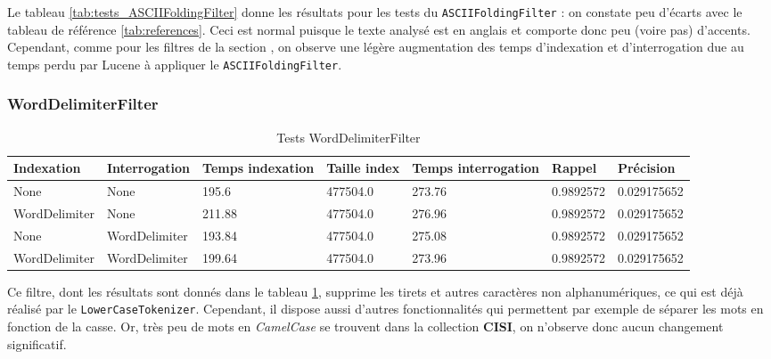Le tableau \ref{tab:tests_ASCIIFoldingFilter} donne les résultats pour les tests du \texttt{ASCIIFoldingFilter} : on constate peu d’écarts avec le tableau de référence \ref{tab:references}. Ceci est normal puisque le texte analysé est en anglais et comporte donc peu (voire pas) d’accents. Cependant, comme pour les filtres de la section \label{section:filtrespourris}, on observe une légère augmentation des temps d’indexation et d’interrogation due au temps perdu par Lucene à appliquer le \texttt{ASCIIFoldingFilter}.

\subsubsection{WordDelimiterFilter}

\begin{table}[!htbp]
    \hspace{-2cm}
                \begin{tabular}{|p{2.1cm}|p{2.1cm}|p{2cm}|p{2cm}|p{2.5cm}|p{2.5cm}|p{2.5cm}|}
                    \hline
                    \textbf{Indexation} & \textbf{Interrogation} & \textbf{Temps \mbox{indexation}} & \textbf{Taille \mbox{index}} & \textbf{Temps \mbox{interrogation}} & \textbf{Rappel} & \textbf{Précision}\\
                    \hline
                    None & None & 195.6 & 477504.0 & 273.76 & 0.9892572 & 0.029175652\\
                    \hline
WordDelimiter & None & 211.88 & 477504.0 & 276.96 & 0.9892572 & 0.029175652\\
		\hline
None & WordDelimiter & 193.84 & 477504.0 & 275.08 & 0.9892572 & 0.029175652\\
		\hline
WordDelimiter & WordDelimiter & 199.64 & 477504.0 & 273.96 & 0.9892572 & 0.029175652\\
                    \hline
                \end{tabular}
                \caption{Tests WordDelimiterFilter}
                \label{tab:tests_WordDelimiterFilter}
            \end{table}

Ce filtre, dont les résultats sont donnés dans le tableau \ref{tab:tests_WordDelimiterFilter}, supprime les tirets et autres caractères non alphanumériques, ce qui est déjà réalisé par le \texttt{LowerCaseTokenizer}. Cependant, il dispose aussi d’autres fonctionnalités qui permettent par exemple de séparer les mots en fonction de la casse. Or, très peu de mots en \textit{CamelCase} se trouvent dans la collection \textbf{CISI}, on n'observe donc aucun changement significatif.

